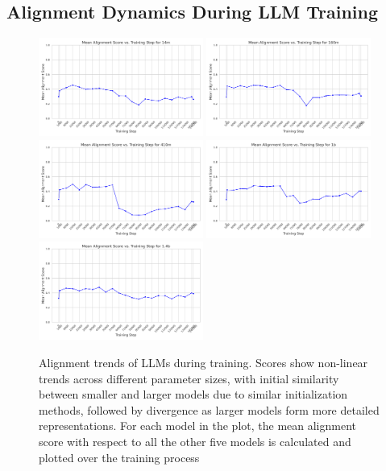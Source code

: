 \documentclass[10pt,a4paper]{article}
\begin{document}
\subsection{Alignment Dynamics During LLM Training}
\begin{figure}[H]
    \centering
    \includegraphics[width=0.48\textwidth]{mean_alignment_score_14m.png}
    \includegraphics[width=0.48\textwidth]{mean_alignment_score_160m.png}
    \includegraphics[width=0.48\textwidth]{mean_alignment_score_410m.png}
    \includegraphics[width=0.48\textwidth]{mean_alignment_score_1b.png}
    \includegraphics[width=0.48\textwidth]{mean_alignment_score_1.4b.png}
    \caption{Alignment trends of LLMs during training. Scores show non-linear trends across different parameter sizes, with initial similarity between smaller and larger models due to similar initialization methods, followed by divergence as larger models form more detailed representations. For each model in the plot, the mean alignment score with respect to all the other five models is calculated and plotted over the training process}
    \label{fig:llm_training_alignment}
\end{figure}
\end{document}
